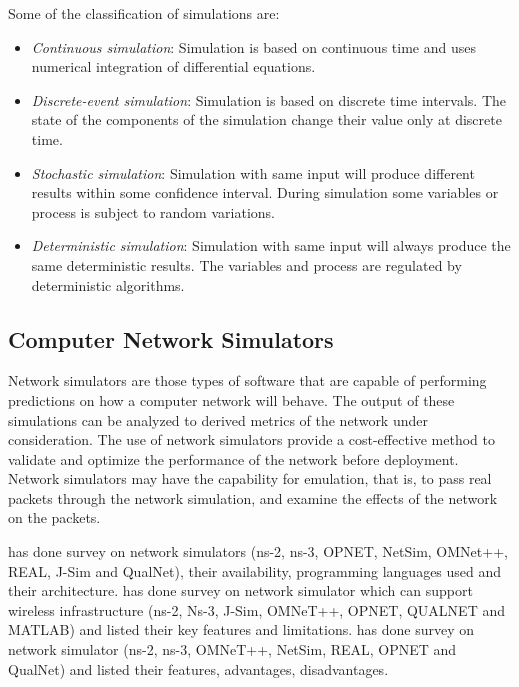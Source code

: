 Some of the classification of simulations are:
\begin{itemize}
	\item \textit{Continuous simulation}: Simulation is based on continuous time and uses numerical integration of differential equations.
	\item \textit{Discrete-event simulation}: Simulation is based on discrete time intervals. The state of the components of the simulation change their value only at discrete time. 
	\item \textit{Stochastic simulation}: Simulation with same input will produce different results within some confidence interval. During simulation some variables or process is subject to random variations.
	\item \textit{Deterministic simulation}: Simulation with same input will always produce the same deterministic results. The variables and process are regulated by deterministic algorithms.
\end{itemize}

\subsection{Computer Network Simulators}

Network simulators are those types of software that are capable of performing predictions on how a computer network will behave. The output of these simulations can be analyzed to derived metrics of the network under consideration. The use of network simulators provide a cost-effective method to validate and optimize the performance of the network before deployment. Network simulators may have the capability for emulation, that is, to pass real packets through the network simulation, and examine the effects of the network on the packets. 

 has done survey on network simulators (ns-2, ns-3, OPNET, NetSim, OMNet++, REAL, J-Sim and QualNet), their availability, programming languages used and their architecture.   has done survey on network simulator which can support wireless infrastructure (ns-2, Ns-3, J-Sim, OMNeT++, OPNET, QUALNET and MATLAB) and listed their key features and limitations.  has done survey on network simulator (ns-2, ns-3, OMNeT++, NetSim, REAL, OPNET and QualNet) and listed their features, advantages, disadvantages.

